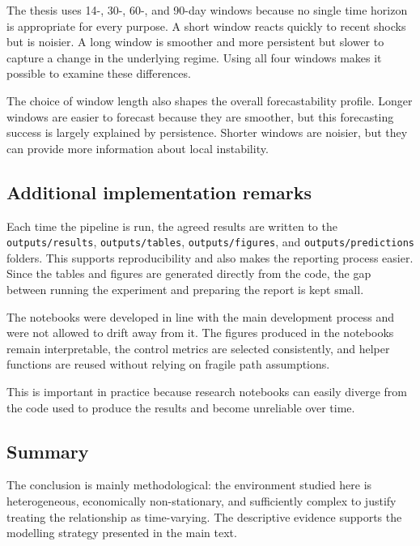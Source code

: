 The thesis uses 14-, 30-, 60-, and 90-day windows because no single time horizon is appropriate for every purpose. A short window reacts quickly to recent shocks but is noisier. A long window is smoother and more persistent but slower to capture a change in the underlying regime. Using all four windows makes it possible to examine these differences.

The choice of window length also shapes the overall forecastability profile. Longer windows are easier to forecast because they are smoother, but this forecasting success is largely explained by persistence. Shorter windows are noisier, but they can provide more information about local instability.

\subsection{Additional implementation remarks}

Each time the pipeline is run, the agreed results are written to the \texttt{outputs/results}, \texttt{outputs/tables}, \texttt{outputs/figures}, and \texttt{outputs/predictions} folders. This supports reproducibility and also makes the reporting process easier. Since the tables and figures are generated directly from the code, the gap between running the experiment and preparing the report is kept small.

The notebooks were developed in line with the main development process and were not allowed to drift away from it. The figures produced in the notebooks remain interpretable, the control metrics are selected consistently, and helper functions are reused without relying on fragile path assumptions.

This is important in practice because research notebooks can easily diverge from the code used to produce the results and become unreliable over time.

\subsection{Summary}

The conclusion is mainly methodological: the environment studied here is heterogeneous, economically non-stationary, and sufficiently complex to justify treating the relationship as time-varying. The descriptive evidence supports the modelling strategy presented in the main text.

